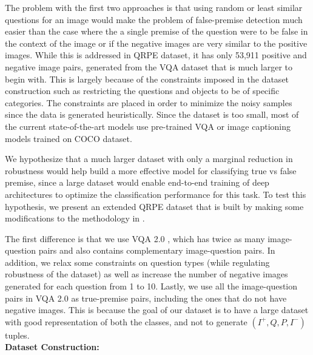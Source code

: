 The problem with the first two approaches is that using random or least similar questions for an image would make the problem of false-premise detection much easier than the case where the a single premise of the question were to be false in the context of the image or if the negative images are very similar to the positive images. While this is addressed in QRPE dataset, it has only 53,911 positive and negative image pairs, generated from the VQA dataset that is much larger to begin with. This is largely because of the constraints imposed in the dataset construction such as restricting the questions and objects to be of specific categories. The constraints are placed in order to minimize the noisy samples since the data is generated heuristically. Since the dataset is too small, most of the current state-of-the-art models use pre-trained VQA or image captioning models trained on COCO dataset.

We hypothesize that a much larger dataset with only a marginal reduction in robustness would help build a more effective model for classifying true vs false premise, since a large dataset would enable end-to-end training of deep architectures to optimize the classification performance for this task. To test this hypothesis, we present an extended QRPE dataset that is built by making some modifications to the methodology in \cite{mahendru2017promise}.

The first difference is that we use VQA 2.0 \cite{goyal2016making}, which has twice as many image-question pairs and also contains complementary image-question pairs. In addition, we relax some constraints on question types (while regulating robustness of the dataset) as well as increase the number of negative images generated for each question from 1 to 10. Lastly, we use all the image-question pairs in VQA 2.0 as true-premise pairs, including the ones that do not have negative images. This is because the goal of our dataset is to have a large dataset with good representation of both the classes, and not to generate $(I^+, Q, P, I^-)$ tuples. \\

\noindent \textbf{Dataset Construction:}

